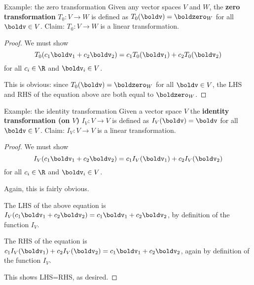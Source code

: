 \begin{frame}{Example: \alert{the zero transformation}}
Given any vector spaces $V$ and $W$, the {\bf zero transformation} $T_0\colon V\rightarrow W$ is defined as $T_0(\boldv)=\boldzero_W$ for all $\boldv\in V$. 
\bpause
\alert{Claim}: $T_0\colon V\rightarrow W$ is a linear transformation. 
\begin{proof}
We must show \[ T_0(c_1\boldv_1+c_2\boldv_2)=c_1T_0(\boldv_1)+c_2T_0(\boldv_2)\] for all $c_i\in\R$ and $\boldv_i\in V$. 

This is obvious: since $T_0(\boldv)=\boldzero_W$ for all $\boldv\in V$, the LHS and RHS of the equation above are both equal to $\boldzero_W$. 
\end{proof}

\end{frame}
\begin{frame}{Example: \alert{the identity transformation}}
Given a vector space $V$ the {\bf identity transformation (on $V$)} $I_V\colon V\rightarrow V$ is defined as $I_V(\boldv)=\boldv$ for all $\boldv\in V$.  
\bpause
\alert{Claim}: $I_V\colon V\rightarrow V$ is a linear transformation. 
\begin{proof}
We must show \[ I_V(c_1\boldv_1+c_2\boldv_2)=c_1I_V(\boldv_1)+c_2I_V(\boldv_2)\] for all $c_i\in\R$ and $\boldv_i\in V$. 

Again, this is fairly obvious. 

The LHS of the above equation is $I_V(c_1\boldv_1+c_2\boldv_2)=c_1\boldv_1+c_2\boldv_2$, by definition of the function $I_V$. 

The RHS of the equation is 
$
c_1I_V(\boldv_1)+c_2I_V(\boldv_2)=c_1\boldv_1+c_2\boldv_2
$, again by definition of the function $I_V$. 

This shows LHS=RHS, as desired. 
\end{proof}
\end{frame}
